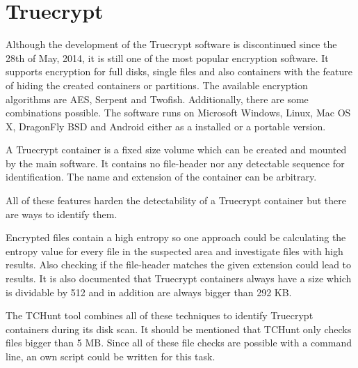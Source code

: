 \section{Truecrypt}
Although the development of the Truecrypt software is discontinued since the 28th of May, 2014, it is still one of the most popular encryption software.
It supports encryption for full disks, single files and also containers with the feature of hiding the created containers or partitions.
The available encryption algorithms are AES, Serpent and Twofish. Additionally, there are some combinations possible.
The software runs on Microsoft Windows, Linux, Mac OS X, DragonFly BSD and Android either as a installed or a portable version.\cite{wiki:truecrypt}

A Truecrypt container is a fixed size volume which can be created and mounted by the main software.
It contains no file-header nor any detectable sequence for identification.
The name and extension of the container can be arbitrary.

All of these features harden the detectability of a Truecrypt container but there are ways to identify them.

Encrypted files contain a high entropy so one approach could be calculating the entropy value for every file in the suspected area and investigate files with high results.
Also checking if the file-header matches the given extension could lead to results.
It is also documented that Truecrypt containers always have a size which is dividable by 512 and in addition are always bigger than 292 KB.\cite{truecrypt:sourceCode}

The TCHunt tool combines all of these techniques to identify Truecrypt containers during its disk scan. It should be mentioned that TCHunt only checks files bigger than 5 MB.
Since all of these file checks are possible with a command line, an own script could be written for this task.
